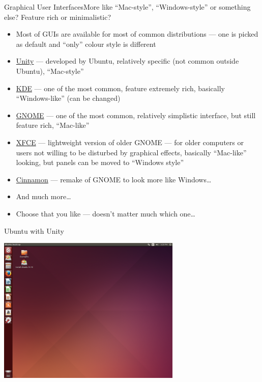 \documentclass[hyperref={bookmarks=true, unicode=true, colorlinks=true, pdftitle={Linux, command line and MetaCentrum}, plainpages=false, pdfauthor={Vojtech Zeisek}, pdfsubject={Course about use of Linux command line, writing shell scripts and using MetaCentrum of CESNET}, pdfcreator={XeLaTeX, http://www.xelatex.org/}, pdfkeywords={Linux, GNU, BASH, shell, command line, MetaCentrum}, linkcolor=Sienna, anchorcolor=black, citecolor=green, filecolor=magenta, menucolor=Sienna, urlcolor=cyan, pdftex}, compress, ucs, xelatex, xcolor=svgnames, 11pt]{beamer}
\begin{document}
\begin{frame}{Graphical User Interfaces}{More like ``Mac-style'', ``Windows-style'' or something else? Feature rich or minimalistic?}
\begin{itemize}
  \item Most of GUIs are available for most of common distributions --- one is picked as default and ``only'' colour style is different
  \item \href{https://unity.ubuntu.com/}{Unity} --- developed by Ubuntu, relatively specific (not common outside Ubuntu), ``Mac-style''
  \item \href{https://www.kde.org/}{KDE} --- one of the most common, feature extremely rich, basically ``Windows-like'' (can be changed)
  \item \href{http://www.gnome.org/}{GNOME} --- one of the most common, relatively simplistic interface, but still feature rich, ``Mac-like''
  \item \href{http://xfce.org/}{XFCE} --- lightweight version of older GNOME --- for older computers or users not willing to be disturbed by graphical effects, basically ``Mac-like'' looking, but panels can be moved to ``Windows style''
  \item \href{http://cinnamon.linuxmint.com/}{Cinnamon} --- remake of GNOME to look more like Windows\ldots
  \item And much more\ldots
  \item Choose that you like --- doesn't matter much which one\ldots
\end{itemize}
\end{frame}

\begin{frame}{Ubuntu with Unity}
\begin{center}
  \includegraphics[height=7cm]{ubuntu.png}
\end{center}
\end{frame}
\end{document}
